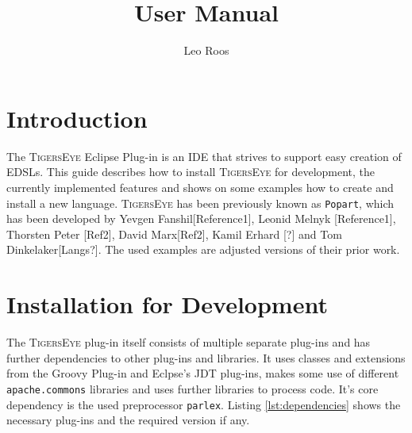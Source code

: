 \documentclass[article,colorback,accentcolor=tud4c]{tudreport}
\title{\tiger \version \\User Manual}
\subtitle{Leo Roos}
\newcommand\tiger{%
  \textsc{TigersEye}
}
\begin{document}
  \maketitle

  \tableofcontents

  \section{Introduction}
  The \tiger Eclipse Plug-in is an IDE that strives to support easy creation of EDSLs. This guide describes how to install  \tiger for development, the currently implemented features and shows on some examples how to create and install a new language.
  \tiger has been previously known as \texttt{Popart}, which has been developed by Yevgen Fanshil[Reference1], Leonid Melnyk [Reference1], Thorsten Peter [Ref2], David Marx[Ref2], Kamil Erhard [?] and Tom Dinkelaker[Langs?]. The used examples are adjusted versions of their prior work.  

  \newpage

  \section{Installation for Development}
	
	The \tiger plug-in itself consists of multiple separate plug-ins and has further dependencies to other plug-ins and libraries. It uses classes and extensions from the Groovy Plug-in and  Eclpse's JDT plug-ins, makes some use of different \texttt{apache.commons} libraries and uses further libraries to process code. It's core dependency is the used preprocessor \texttt{parlex}. Listing \ref{lst:dependencies} shows the necessary plug-ins and the required version if any.
	
\end{document}
